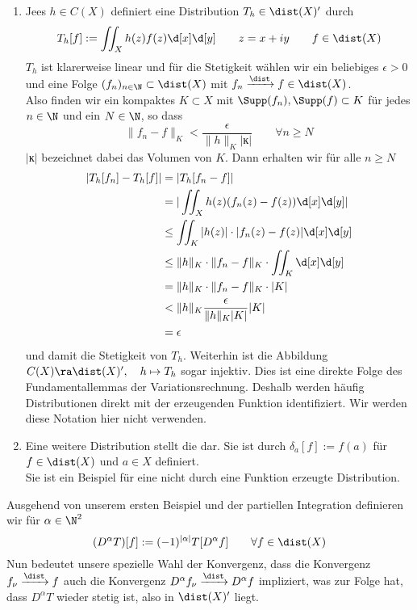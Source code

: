 \begin{bsp}
  \begin{enumerate}
  \item Jees $h \in C(X)$ definiert eine Distribution $T_h \in
    \dist(X)'$ durch
    \[
    T_h[f] := \iint_X h(z) f(z) \d[x]\d[y] \qquad z = x+iy \qquad f
    \in \dist(X)
    \]
    $T_h$ ist klarerweise linear und für die Stetigkeit wählen wir ein
    beliebiges $\epsilon > 0$ und eine Folge $(f_n)_{n \in\N} \subset
    \dist(X)$ mit $f_n \xrightarrow{\dist} f \in \dist(X)$. \\
    Also finden wir ein kompaktes $K \subset X$ mit $\Supp(f_n),
    \Supp(f) \subset K$ für jedes $n \in \N$ und ein $N \in \N$, so
    dass
    \[
    \|f_n -f\|_K < \frac{\epsilon}{\|h\|_K |ĸ|} \qquad \forall n \geq N
    \]
    $|ĸ|$ bezeichnet dabei das Volumen von $K$. Dann erhalten wir für
    alle $n \geq N$
    \begin{align*}
      |T_h[f_n] - T_h[f]| & = | T_h[f_n -f]| \\
      & = | \iint_X h(z) (f_n(z) - f(z)) \d[x]\d[y]| \\
      & \leq \iint_K |h(z)| \cdot |f_n(z) - f(z)| \d[x]\d[y]\\
      & \leq \|h\|_K \cdot\|f_n - f\|_K \cdot \iint_K \d[x] \d[y] \\
      & = \|h\|_K \cdot \|f_n - f\|_K \cdot |K| \\
      & < \|h\|_K \frac{\epsilon}{\|h\|_K |K|} |K| \\
      & = \epsilon
    \end{align*}
    und damit die Stetigkeit von $T_h$.
    Weiterhin ist die Abbildung $C(X) \ra \dist(X)', \quad h \mapsto
    T_h$ sogar injektiv. Dies ist eine direkte Folge des
    Fundamentallemmas der Variationsrechnung. Deshalb werden häufig
    Distributionen direkt mit der erzeugenden Funktion
    identifiziert. Wir werden diese Notation hier nicht verwenden.
  \item Eine weitere Distribution stellt die  dar. Sie ist durch $\delta_a[f] := f(a)$ für $f
    \in \dist(X)$ und $a \in X$ definiert. \\
    Sie ist ein Beispiel für eine nicht durch eine Funktion erzeugte Distribution.
  \end{enumerate}
\end{bsp}

\begin{defin} 
  Ausgehend von unserem ersten Beispiel und der partiellen Integration
  definieren wir für $\alpha \in \N^2$
  \[
  (D^\alpha T)[f] := (-1)^{|\alpha|} T[D^\alpha f] \qquad \forall f
  \in \dist(X)
  \]
  Nun bedeutet unsere spezielle Wahl der Konvergenz, dass die
  Konvergenz $f_\nu \xrightarrow{\dist} f$ auch die Konvergenz
  $D^\alpha f_\nu \xrightarrow{\dist} D^\alpha f$ impliziert, was zur
  Folge hat, dass $D^\alpha T$ wieder stetig ist, also in $\dist(X)'$ liegt.
\end{defin}


